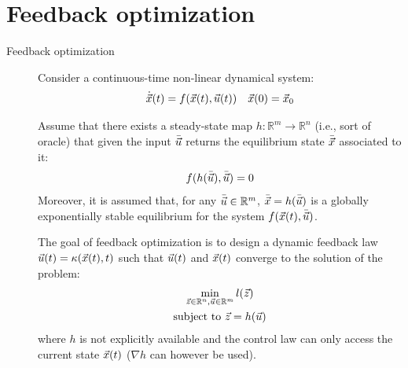 \chapter{Feedback optimization}




\begin{description}
    \item[Feedback optimization] 
        Consider a continuous-time non-linear dynamical system:
        \[
            \dot{{\vec{x}}}(t) = f({\vec{x}}(t), {\vec{u}}(t)) \quad {\vec{x}}(0) = {\vec{x}}_0
        \]
        
        Assume that there exists a steady-state map $h: \mathbb{R}^m \rightarrow \mathbb{R}^n$ (i.e., sort of oracle) that given the input $\bar{{\vec{u}}}$ returns the equilibrium state $\bar{{\vec{x}}}$ associated to it:
        \[
                f(h(\bar{{\vec{u}}}), \bar{{\vec{u}}}) = 0
        \]
        Moreover, it is assumed that, for any $\bar{{\vec{u}}} \in \mathbb{R}^m$, $\bar{{\vec{x}}} = h(\bar{{\vec{u}}})$ is a globally exponentially stable equilibrium for the system $f({\vec{x}}(t), \bar{{\vec{u}}})$.

        The goal of feedback optimization is to design a dynamic feedback law ${\vec{u}}(t) = \kappa({\vec{x}}(t), t)$ such that ${\vec{u}}(t)$ and ${\vec{x}}(t)$ converge to the solution of the problem:
        \[
            \begin{gathered}
                \min_{{\vec{z}} \in \mathbb{R}^n, {\vec{u}} \in \mathbb{R}^m} l({\vec{z}}) \\
                \text{subject to } {\vec{z}} = h({\vec{u}})
            \end{gathered}
        \]
        where $h$ is not explicitly available and the control law can only access the current state ${\vec{x}}(t)$ ($\nabla h$ can however be used).


\end{description}
